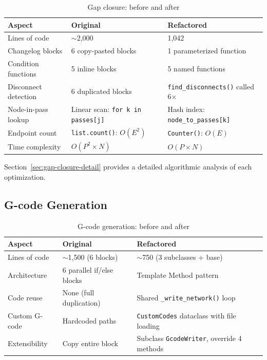 \documentclass[11pt,a4paper]{article}
\begin{document}
\begin{table}[H]
\centering
\caption{Gap closure: before and after}
\begin{tabularx}{\textwidth}{lXX}
\toprule
\textbf{Aspect} & \textbf{Original} & \textbf{Refactored} \\
\midrule
Lines of code & $\sim$2,000 & 1,042 \\
Changelog blocks & 6 copy-pasted blocks & 1 parameterized function \\
Condition functions & 5 inline blocks & 5 named functions \\
Disconnect detection & 6 duplicated blocks & \texttt{find\_disconnects()} called 6$\times$ \\
Node-in-pass lookup & Linear scan: \texttt{for k in passes[j]} & Hash index: \texttt{node\_to\_passes[k]} \\
Endpoint count & \texttt{list.count()}: $O(E^2)$ & \texttt{Counter()}: $O(E)$ \\
Time complexity & $O(P^2 \times N)$ & $O(P \times N)$ \\
\bottomrule
\end{tabularx}
\end{table}

Section~\ref{sec:gap-closure-detail} provides a detailed algorithmic analysis of each optimization.

\subsection{G-code Generation}

\begin{table}[H]
\centering
\caption{G-code generation: before and after}
\begin{tabularx}{\textwidth}{lXX}
\toprule
\textbf{Aspect} & \textbf{Original} & \textbf{Refactored} \\
\midrule
Lines of code & $\sim$1,500 (6 blocks) & $\sim$750 (3 subclasses + base) \\
Architecture & 6 parallel if/else blocks & Template Method pattern \\
Code reuse & None (full duplication) & Shared \texttt{\_write\_network()} loop \\
Custom G-code & Hardcoded paths & \texttt{CustomCodes} dataclass with file loading \\
Extensibility & Copy entire block & Subclass \texttt{GcodeWriter}, override 4 methods \\
\bottomrule
\end{tabularx}
\end{table}
\end{document}
